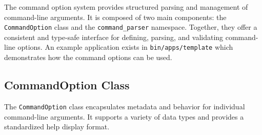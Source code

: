 The command option system provides structured parsing and management of command-line arguments. It is composed of two main components: the \texttt{CommandOption} class and the \texttt{command\_parser} namespace. Together, they offer a consistent and type-safe interface for defining, parsing, and validating command-line options. An example application exists in \texttt{bin/apps/template} which demonstrates how the command options can be used.

\subsection{CommandOption Class}

The \texttt{CommandOption} class encapsulates metadata and behavior for individual command-line arguments. It supports a variety of data types and provides a standardized help display format.

